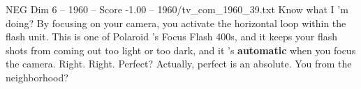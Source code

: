 \begin{textsample}{NEG Dim 6 – 1960 – Score -1.00 – 1960/tv\_com\_1960\_39.txt}  \label{ex:f6_neg_078}
Know what I 'm doing?
By focusing on your camera, you activate the horizontal loop within the flash unit.
This is one of Polaroid 's Focus Flash 400s, and it keeps your flash shots from coming out too light or too dark, and it 's \textbf{automatic} when you focus the camera.
Right.
Right.
Perfect?
Actually, perfect is an absolute.
You from the neighborhood?

\end{textsample}
